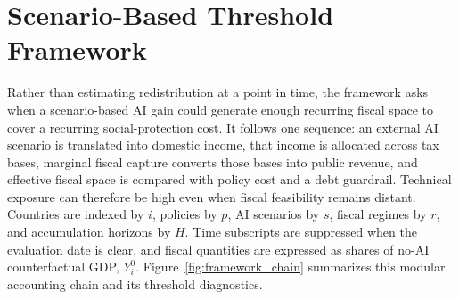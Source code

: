 \section{Scenario-Based Threshold Framework}\label{sec:framework}

Rather than estimating redistribution at a point in time, the framework asks when a scenario-based AI gain could generate enough recurring fiscal space to cover a recurring social-protection cost. It follows one sequence: an external AI scenario is translated into domestic income, that income is allocated across tax bases, marginal fiscal capture converts those bases into public revenue, and effective fiscal space is compared with policy cost and a debt guardrail. Technical exposure can therefore be high even when fiscal feasibility remains distant. Countries are indexed by $i$, policies by $p$, AI scenarios by $s$, fiscal regimes by $r$, and accumulation horizons by $H$. Time subscripts are suppressed when the evaluation date is clear, and fiscal quantities are expressed as shares of no-AI counterfactual GDP, $Y_i^0$. Figure~\ref{fig:framework_chain} summarizes this modular accounting chain and its threshold diagnostics.

